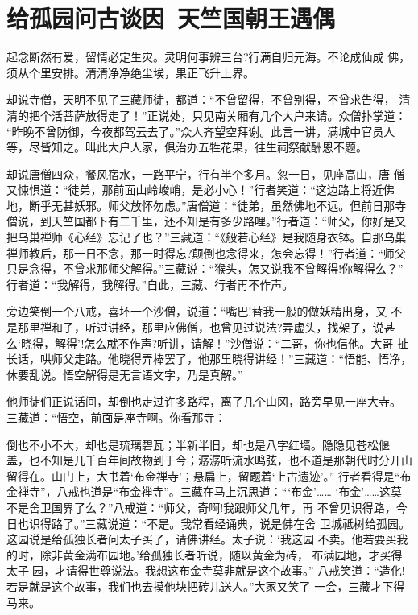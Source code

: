 \chapter{给孤园问古谈因~天竺国朝王遇偶}

起念断然有爱，留情必定生灾。灵明何事辨三台?行满自归元海。不论成仙成
佛，须从个里安排。清清净净绝尘埃，果正飞升上界。

却说寺僧，天明不见了三藏师徒，都道：“不曾留得，不曾别得，不曾求告得，
清清的把个活菩萨放得走了！”正说处，只见南关厢有几个大户来请。众僧扑掌道：
“昨晚不曾防御，今夜都驾云去了。”众人齐望空拜谢。此言一讲，满城中官员人
等，尽皆知之。叫此大户人家，俱治办五牲花果，往生祠祭献酬恩不题。

却说唐僧四众，餐风宿水，一路平宁，行有半个多月。忽一日，见座高山，唐
僧又悚惧道：“徒弟，那前面山岭峻峭，是必小心！”行者笑道：“这边路上将近佛
地，断乎无甚妖邪。师父放怀勿虑。”唐僧道：“徒弟，虽然佛地不远。但前日那寺
僧说，到天竺国都下有二千里，还不知是有多少路哩。”行者道：“师父，你好是又
把乌巢禅师《心经》忘记了也？”三藏道：“《般若心经》是我随身衣钵。自那乌巢
禅师教后，那一日不念，那一时得忘?颠倒也念得来，怎会忘得！”行者道：“师父
只是念得，不曾求那师父解得。”三藏说：“猴头，怎又说我不曾解得!你解得么？”
行者道：“我解得，我解得。”自此，三藏、行者再不作声。

旁边笑倒一个八戒，喜坏一个沙僧，说道：“嘴巴!替我一般的做妖精出身，又
不是那里禅和子，听过讲经，那里应佛僧，也曾见过说法?弄虚头，找架子，说甚
么‘晓得，解得’!怎么就不作声?听讲，请解！”沙僧说：“二哥，你也信他。大哥
扯长话，哄师父走路。他晓得弄棒罢了，他那里晓得讲经！”三藏道：“悟能、悟净，
休要乱说。悟空解得是无言语文字，乃是真解。”

他师徒们正说话间，却倒也走过许多路程，离了几个山冈，路旁早见一座大寺。
三藏道：“悟空，前面是座寺啊。你看那寺：

倒也不小不大，却也是琉璃碧瓦；半新半旧，却也是八字红墙。隐隐见苍松偃
盖，也不知是几千百年间故物到于今；潺潺听流水鸣弦，也不道是那朝代时分开山
留得在。山门上，大书着‘布金禅寺’；悬扁上，留题着‘上古遗迹’。”
行者看得是“布金禅寺”，八戒也道是“布金禅寺”。三藏在马上沉思道：“‘布金’……
‘布金’……这莫不是舍卫国界了么？”八戒道：“师父，奇啊!我跟师父几年，再
不曾见识得路，今日也识得路了。”三藏说道：“不是。我常看经诵典，说是佛在舍
卫城祗树给孤园。这园说是给孤独长者问太子买了，请佛讲经。太子说：‘我这园
不卖。他若要买我的时，除非黄金满布园地。’给孤独长者听说，随以黄金为砖，
布满园地，才买得太子园，才请得世尊说法。我想这布金寺莫非就是这个故事。”
八戒笑道：“造化!若是就是这个故事，我们也去摸他块把砖儿送人。”大家又笑了
一会，三藏才下得马来。

